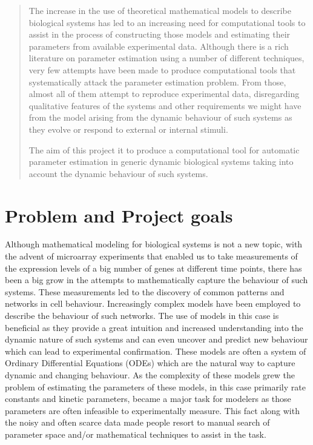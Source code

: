 \documentclass[12pt,a4paper,titlepage]{article}
\begin{document}

\begin{abstract}
The increase in the use of theoretical mathematical models to describe biological systems has led to an increasing need for computational tools to assist in the process of constructing those models and estimating their parameters from available experimental data. Although there is a rich literature on parameter estimation using a number of different techniques, very few attempts have been made to produce computational tools that systematically attack the parameter estimation problem. From those, almost all of them attempt to reproduce experimental data, disregarding qualitative features of the systems and other requirements we might have from the model arising from the dynamic behaviour of such systems as they evolve or respond to external or internal stimuli.

The aim of this project it to produce a computational tool for automatic parameter estimation in generic dynamic biological systems taking into account the dynamic behaviour of such systems.
\end{abstract}
\tableofcontents
\newpage
\section{Problem and Project goals}
Although mathematical modeling for biological systems is not a new topic, with the advent of microarray experiments that enabled us to take measurements of the expression levels of a big number of genes at different time points, there has been a big grow in the attempts to mathematically capture the behaviour of such systems. These measurements led to the discovery of common patterns and networks in cell behaviour. Increasingly complex models have been employed to describe the behaviour of such networks.  The use of models in this case is beneficial as they provide a great intuition and increased understanding into the dynamic nature of such systems and can even uncover and predict new behaviour which can lead to experimental confirmation. These models are often a system of Ordinary Differential Equations (ODEs) which are the natural way to capture dynamic and changing behaviour. As the complexity of these models grew the problem of estimating the parameters of these models, in this case primarily rate constants and kinetic parameters, became a major task for modelers as those parameters are often infeasible to experimentally measure. This fact along with the noisy and often scarce data made people resort to manual search of parameter space and/or mathematical techniques to assist in the task. 
\end{document}
